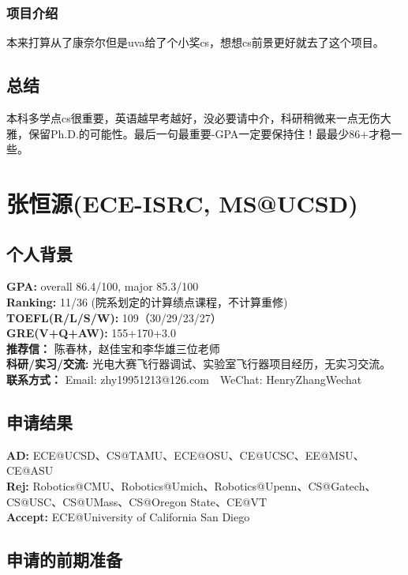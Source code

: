 \documentclass[a4paper,UTF8]{book}
\begin{document}
        \subsubsection*{项目介绍}
        本来打算从了康奈尔但是uva给了个小奖cs，想想cs前景更好就去了这个项目。

    \subsection*{总结}
    本科多学点cs很重要，英语越早考越好，没必要请中介，科研稍微来一点无伤大雅，保留Ph.D.的可能性。最后一句最重要-GPA一定要保持住！最最少86+才稳一些。



\clearpage
\section{张恒源(ECE-ISRC, MS@UCSD)}
    \subsection*{个人背景}
        \textbf{GPA:} overall 86.4/100, major 85.3/100\\
        \textbf{Ranking:} 11/36 (院系划定的计算绩点课程，不计算重修)\\
        \textbf{TOEFL(R/L/S/W):} 109（30/29/23/27）\\
        \textbf{GRE(V+Q+AW):} 155+170+3.0\\
        \textbf{推荐信：} 陈春林，赵佳宝和李华雄三位老师\\
        \textbf{科研/实习/交流:} 光电大赛飞行器调试、实验室飞行器项目经历，无实习交流。\\ 
        \textbf{联系方式：} Email: zhy19951213@126.com$\quad$WeChat: HenryZhangWechat

    \subsection*{申请结果}
        \textbf{AD:} ECE@UCSD、CS@TAMU、ECE@OSU、CE@UCSC、EE@MSU、CE@ASU\\
        \textbf{Rej:} Robotics@CMU、Robotics@Umich、Robotics@Upenn、CS@Gatech、CS@USC、CS@UMass、CS@Oregon State、CE@VT\\
        \textbf{Accept:} ECE@University of California San Diego

    \subsection*{申请的前期准备}
\end{document}
